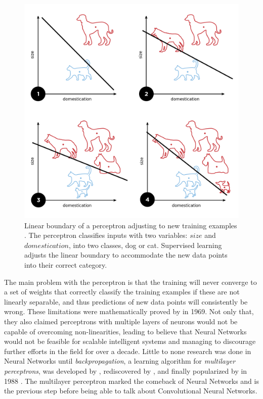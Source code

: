 \begin{figure}[htb]
  \includegraphics[width=\textwidth]{gfx/perceptron-training}
  \caption{Linear boundary of a perceptron adjusting to new training examples \cite{Goodspeed2015}.
    The perceptron classifies inputs with two variables: $size$ and $domestication$, into two classes, dog or cat.
    Supervised learning adjusts the linear boundary to accommodate the new data points into their correct category.}
  \label{fig:sec:theory:perceptron-training}
\end{figure}

The main problem with the perceptron is that the training will never converge to a set of weights that correctly classify the training examples if these are not linearly separable, and thus predictions of new data points will consistently be wrong.
These limitations were mathematically proved by \citet{Minsky1969} in 1969.
Not only that, they also claimed perceptrons with multiple layers of neurons would not be capable of overcoming non-linearities, leading to believe that Neural Networks would not be feasible for scalable intelligent systems and managing to discourage further efforts in the field for over a decade.
Little to none research was done in Neural Networks until \emph{backpropagation}, a learning algorithm for \emph{multilayer perceptrons}, was developed by \citet{Werbos1974}, rediscovered by \citet{Parker1985}, and finally popularized by \citet{Rumelhart1988} in 1988 \cite{Ruck1990}.
The multilayer perceptron marked the comeback of Neural Networks and is the previous step before being able to talk about Convolutional Neural Networks.


